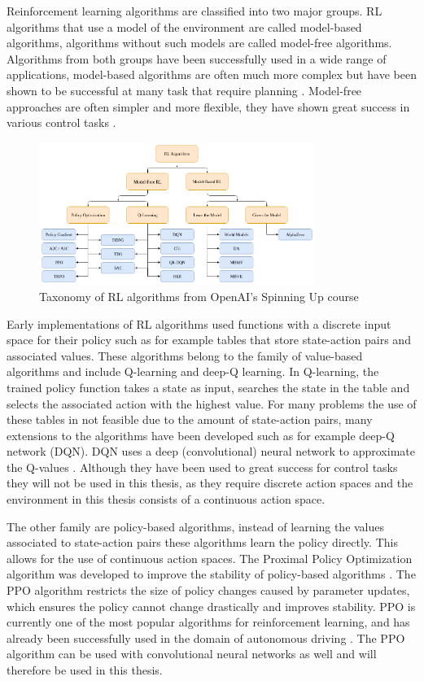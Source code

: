 Reinforcement learning algorithms are classified into two major groups. RL algorithms that use a model of the environment are called model-based algorithms, algorithms without such models are called model-free algorithms. Algorithms from both groups have been successfully used in a wide range of applications, model-based algorithms are often much more complex but have been shown to be successful at many task that require planning \autocite{alphagoimprovementmuzero}. Model-free approaches are often simpler and more flexible, they have shown great success in various control tasks \autocite{atari}.

\begin{figure}
    \centering
    \includegraphics[width=0.8\textwidth]{Bilder/openai_spinningup_taxonomy.png}
    \caption{Taxonomy of RL algorithms from OpenAI's Spinning Up course \autocite{spinningup}}
\end{figure}

Early implementations of RL algorithms used functions with a discrete input space for their policy such as for example tables that store state-action pairs and associated values. These algorithms belong to the family of value-based algorithms and include Q-learning and deep-Q learning. In Q-learning, the trained policy function takes a state as input, searches the state in the table and selects the associated action with the highest value. For many problems the use of these tables in not feasible due to the amount of state-action pairs, many extensions to the algorithms have been developed such as for example deep-Q network (DQN). DQN uses a deep (convolutional) neural network to approximate the Q-values \autocite{atari}.
Although they have been used to great success for control tasks they will not be used in this thesis, as they require discrete action spaces and the environment in this thesis consists of a continuous action space.


The other family are policy-based algorithms, instead of learning the values associated to state-action pairs these algorithms learn the policy directly. This allows for the use of continuous action spaces. The Proximal Policy Optimization algorithm was developed to improve the stability of policy-based algorithms \autocite{ppo}. The PPO algorithm restricts the size of policy changes caused by parameter updates, which ensures the policy cannot change drastically and improves stability. PPO is currently one of the most popular algorithms for reinforcement learning, and has already been successfully used in the domain of autonomous driving \autocite{maximilian}. The PPO algorithm can be used with convolutional neural networks as well and will therefore be used in this thesis.


